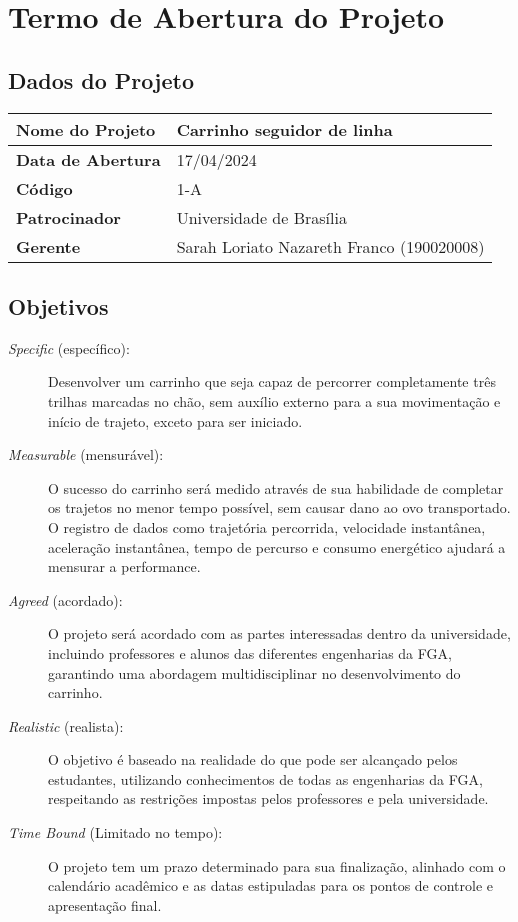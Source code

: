 \chapter{Termo de Abertura do Projeto}

\section{Dados do Projeto}

\begin{center}
  \begin{tabular}{|l|l|}
    \hline
    \textbf{Nome do Projeto} & Carrinho seguidor de linha \\
    \hline
    \textbf{Data de Abertura} & 17/04/2024 \\
    \hline
    \textbf{Código} & 1-A \\
    \hline
    \textbf{Patrocinador} & Universidade de Brasília \\
    \hline
    \textbf{Gerente} & Sarah Loriato Nazareth Franco (190020008) \\
    \hline
  \end{tabular}
\end{center}

\section{Objetivos}

\begin{description}
  \item [\textit{Specific} (específico):]
    Desenvolver um carrinho que seja capaz de percorrer completamente três
    trilhas marcadas no chão, sem auxílio externo para a sua movimentação e
    início de trajeto, exceto para ser iniciado.
  \item [\textit{Measurable} (mensurável):]
    O sucesso do carrinho será medido através de sua habilidade de completar os
    trajetos no menor tempo possível, sem causar dano ao ovo transportado. O
    registro de dados como trajetória percorrida, velocidade instantânea,
    aceleração instantânea, tempo de percurso e consumo energético ajudará a
    mensurar a performance.
  \item [\textit{Agreed} (acordado):]
    O projeto será acordado com as partes interessadas dentro da universidade,
    incluindo professores e alunos das diferentes engenharias da FGA, garantindo
    uma abordagem multidisciplinar no desenvolvimento do carrinho.
  \item [\textit{Realistic} (realista):]
    O objetivo é baseado na realidade do que pode ser alcançado pelos
    estudantes, utilizando conhecimentos de todas as engenharias da FGA,
    respeitando as restrições impostas pelos professores e pela universidade.
  \item [\textit{Time Bound} (Limitado no tempo):]
    O projeto tem um prazo determinado para sua finalização, alinhado com o
    calendário acadêmico e as datas estipuladas para os pontos de controle e
    apresentação final.
\end{description}
